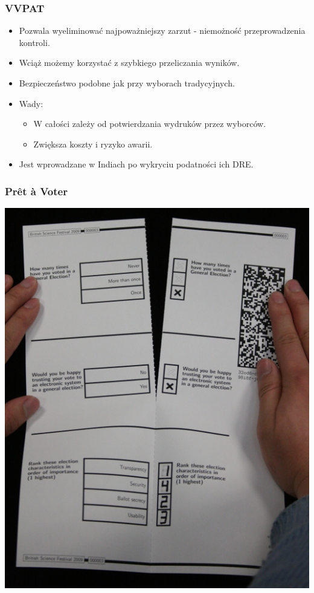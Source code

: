 \documentclass{beamer}
\begin{document}
\begin{frame}
\frametitle{VVPAT}
\begin{itemize}
\item Pozwala wyeliminować najpoważniejszy zarzut - niemożność przeprowadzenia kontroli.\pause
\item Wciąż możemy korzystać z szybkiego przeliczania wyników. \pause
\item Bezpieczeństwo podobne jak przy wyborach tradycyjnych.\pause
\item Wady:\pause
\begin{itemize}
\item W całości zależy od potwierdzania wydruków przez wyborców.\pause
\item Zwiększa koszty i ryzyko awarii. \pause
\end{itemize}
\item Jest wprowadzane w Indiach po wykryciu podatności ich DRE.
\end{itemize}
\end{frame}

\begin{frame}
\frametitle{Prêt à Voter}
\includegraphics[height=0.8\paperheight, center]{pret}
\end{frame}
\end{document}
